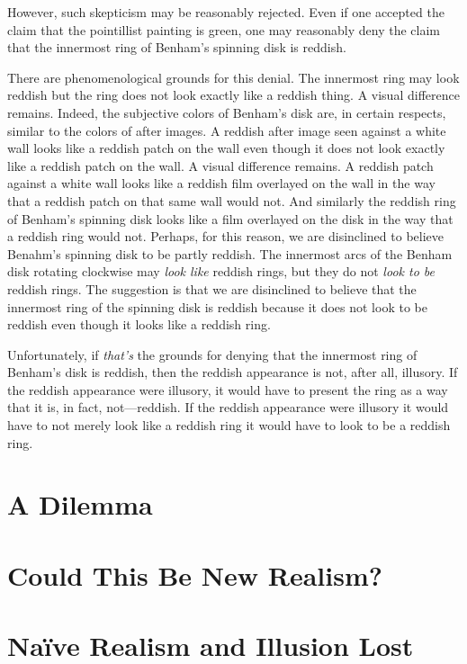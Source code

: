 \documentclass[12pt]{article}
\begin{document}
However, such skepticism may be reasonably rejected. Even if one accepted the claim that the pointillist painting is green, one may reasonably deny the claim that the innermost ring of Benham's spinning disk is reddish. %

There are phenomenological grounds for this denial. The innermost ring may look reddish but the ring does not look exactly like a reddish thing. A visual difference remains. Indeed, the subjective colors of Benham's disk are, in certain respects, similar to the colors of after images. A reddish after image seen against a white wall looks like a reddish patch on the wall even though it does not look exactly like a reddish patch on the wall. A visual difference remains. A reddish patch against a white wall looks like a reddish film overlayed on the wall in the way that a reddish patch on that same wall would not. And similarly the reddish ring of Benham's spinning disk looks like a film overlayed on the disk in the way that a reddish ring would not. Perhaps, for this reason, we are disinclined to believe Benahm's spinning disk to be partly reddish. The innermost arcs of the Benham disk rotating clockwise may \emph{look like} reddish rings, but they do not \emph{look to be} reddish rings. The suggestion is that we are disinclined to believe that the innermost ring of the spinning disk is reddish because it does not look to be reddish even though it looks like a reddish ring.

Unfortunately, if \emph{that's} the grounds for denying that the innermost ring of Benham's disk is reddish, then the reddish appearance is not, after all, illusory. If the reddish appearance were illusory, it would have to present the ring as a way that it is, in fact, not---reddish. If the reddish appearance were illusory it would have to not merely look like a reddish ring it would have to look to be a reddish ring.


\section{A Dilemma}\label{sec:a_dilemma} %




\section{Could This Be New Realism?}\label{sec:could_this_be_new_realism_} %




\section{Naïve Realism and Illusion Lost}\label{sec:naïve_realism_and_illusion_lost} %




 
 
\end{document}
